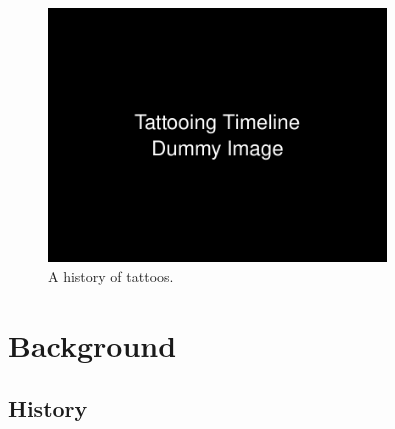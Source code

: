 \documentclass[11pt]{article}
\begin{document}
\pagebreak

\begin{figure}[h]
    \centering
    \includegraphics[width=0.8\textwidth]{figures/timeline.png}
    \caption{A history of tattoos.}
    \label{fig:timeline}
\end{figure}

\section{Background}

\subsection{History}
\end{document}

